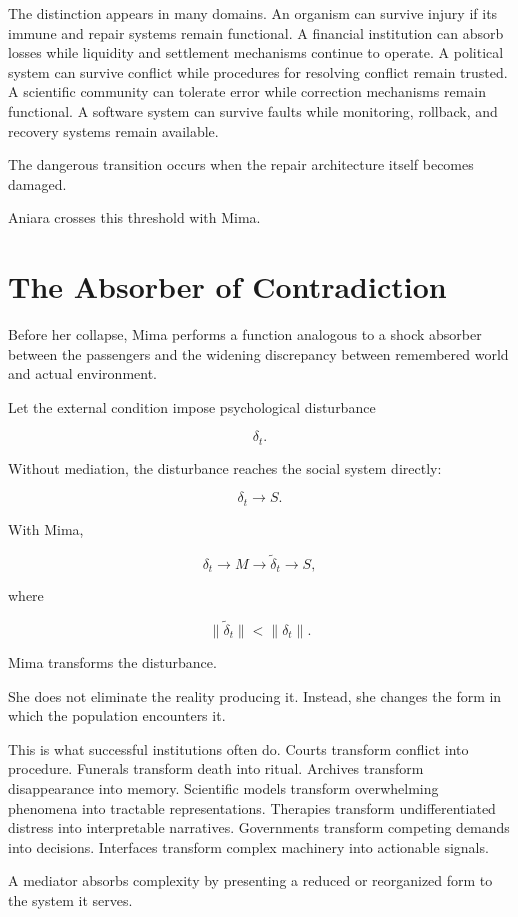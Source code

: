 \documentclass[11pt,oneside]{book}
\theoremstyle{definition}
\theoremstyle{remark}
\begin{document}
The distinction appears in many domains. An organism can survive injury if its immune and repair systems remain functional. A financial institution can absorb losses while liquidity and settlement mechanisms continue to operate. A political system can survive conflict while procedures for resolving conflict remain trusted. A scientific community can tolerate error while correction mechanisms remain functional. A software system can survive faults while monitoring, rollback, and recovery systems remain available.

The dangerous transition occurs when the repair architecture itself becomes damaged.

Aniara crosses this threshold with Mima.

\section{The Absorber of Contradiction}

Before her collapse, Mima performs a function analogous to a shock absorber between the passengers and the widening discrepancy between remembered world and actual environment.

Let the external condition impose psychological disturbance

\[
\delta_t.
\]

Without mediation, the disturbance reaches the social system directly:

\[
\delta_t\rightarrow S.
\]

With Mima,

\[
\delta_t
\rightarrow
M
\rightarrow
\widetilde{\delta}_t
\rightarrow
S,
\]

where

\[
\|\widetilde{\delta}_t\|
<
\|\delta_t\|.
\]

Mima transforms the disturbance.

She does not eliminate the reality producing it. Instead, she changes the form in which the population encounters it.

This is what successful institutions often do. Courts transform conflict into procedure. Funerals transform death into ritual. Archives transform disappearance into memory. Scientific models transform overwhelming phenomena into tractable representations. Therapies transform undifferentiated distress into interpretable narratives. Governments transform competing demands into decisions. Interfaces transform complex machinery into actionable signals.

A mediator absorbs complexity by presenting a reduced or reorganized form to the system it serves.
\end{document}
